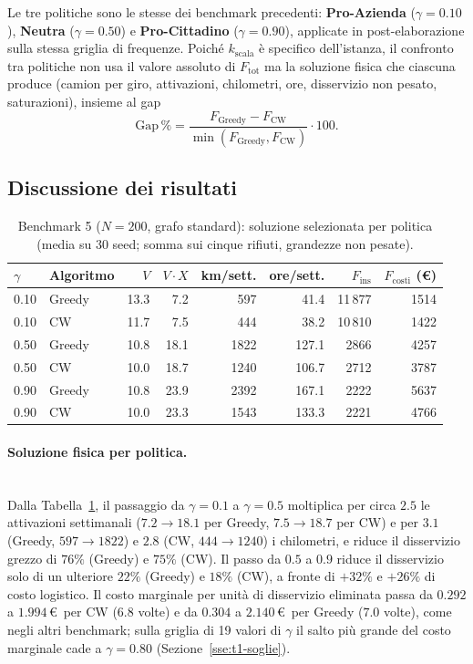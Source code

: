 Le tre politiche sono le stesse dei benchmark precedenti: \textbf{Pro-Azienda} ($\gamma=0.10$), \textbf{Neutra} ($\gamma=0.50$) e \textbf{Pro-Cittadino} ($\gamma=0.90$), applicate in post-elaborazione sulla stessa griglia di frequenze. Poiché $k_{\mathrm{scala}}$ è specifico dell'istanza, il confronto tra politiche non usa il valore assoluto di $F_{\mathrm{tot}}$ ma la soluzione fisica che ciascuna produce (camion per giro, attivazioni, chilometri, ore, disservizio non pesato, saturazioni), insieme al gap
\[
\text{Gap}\,\% = \frac{F_{\text{Greedy}}-F_{\text{CW}}}{\min(F_{\text{Greedy}},F_{\text{CW}})}\cdot100 .
\]

\subsection{Discussione dei risultati}\label{sse:b5-discussione}

\begin{table}[htbp]
	\centering
	\caption{Benchmark 5 ($N=200$, grafo standard): soluzione selezionata per politica (media su 30 seed; somma sui cinque rifiuti, grandezze non pesate).}
	\label{tab:b5_fisica}
	\small
	\begin{tabular}{llrrrrrr}
		\hline
		$\gamma$ & Algoritmo & $V$ & $V\!\cdot\!X$ & km/sett. & ore/sett. & $F_{\mathrm{ins}}$ & $F_{\mathrm{costi}}$ (\euro) \\
		\hline
		0.10 & Greedy & 13.3 & 7.2  & 597  & 41.4  & 11\,877 & 1514 \\
		0.10 & CW     & 11.7 & 7.5  & 444  & 38.2  & 10\,810 & 1422 \\
		0.50 & Greedy & 10.8 & 18.1 & 1822 & 127.1 & 2866    & 4257 \\
		0.50 & CW     & 10.0 & 18.7 & 1240 & 106.7 & 2712    & 3787 \\
		0.90 & Greedy & 10.8 & 23.9 & 2392 & 167.1 & 2222    & 5637 \\
		0.90 & CW     & 10.0 & 23.3 & 1543 & 133.3 & 2221    & 4766 \\
		\hline
	\end{tabular}
\end{table}

\paragraph{Soluzione fisica per politica.}\mbox{}\\
Dalla Tabella~\ref{tab:b5_fisica}, il passaggio da $\gamma=0.1$ a $\gamma=0.5$ moltiplica per circa $2.5$ le attivazioni settimanali ($7.2\rightarrow18.1$ per Greedy, $7.5\rightarrow18.7$ per CW) e per $3.1$ (Greedy, $597\rightarrow1822$) e $2.8$ (CW, $444\rightarrow1240$) i chilometri, e riduce il disservizio grezzo di $76\%$ (Greedy) e $75\%$ (CW). Il passo da $0.5$ a $0.9$ riduce il disservizio solo di un ulteriore $22\%$ (Greedy) e $18\%$ (CW), a fronte di $+32\%$ e $+26\%$ di costo logistico. Il costo marginale per unità di disservizio eliminata passa da $0.292$ a $1.994$\,\euro\ per CW ($6.8$ volte) e da $0.304$ a $2.140$\,\euro\ per Greedy ($7.0$ volte), come negli altri benchmark; sulla griglia di 19 valori di $\gamma$ il salto più grande del costo marginale cade a $\gamma=0.80$ (Sezione~\ref{sse:t1-soglie}).

